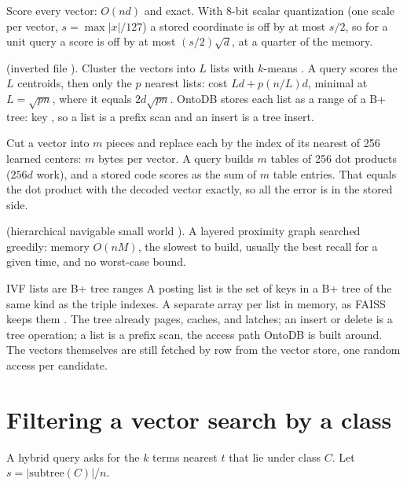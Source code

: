 \begin{description}[leftmargin=1.2em]
\item[Flat.] Score every vector: $O(nd)$ and exact. With 8-bit scalar
quantization (one scale per vector, $s = \max|x|/127$) a stored coordinate is
off by at most $s/2$, so for a unit query a score is off by at most
$(s/2)\sqrt d$, at a quarter of the memory.
\item[IVF] (inverted file \cite{jegou2011}). Cluster the vectors into $L$ lists
with $k$-means \cite{arthur2007}. A query scores the $L$ centroids, then only the
$p$ nearest lists: cost $Ld + p(n/L)d$, minimal at $L=\sqrt{pn}$, where it equals
$2d\sqrt{pn}$. OntoDB stores each list as a range of a B+ tree: key
, so a list is a prefix scan and an insert is a tree
insert.
\item[Product quantization.] Cut a vector into $m$ pieces and replace each by the
index of its nearest of 256 learned centers: $m$ bytes per vector. A query builds
$m$ tables of 256 dot products ($256d$ work), and a stored code scores as the sum
of $m$ table entries. That equals the dot product with the decoded vector exactly,
so all the error is in the stored side.
\item[HNSW] (hierarchical navigable small world \cite{malkov2020}). A layered
proximity graph searched greedily: memory $O(nM)$, the slowest to build, usually
the best recall for a given time, and no worst-case bound.
\end{description}

\begin{decision}{IVF lists are B+ tree ranges}
 A posting list is the set of keys  in a
B+ tree of the same kind as the triple indexes.
 A separate array per list in memory, as FAISS keeps them
\cite{johnson2021}.
 The tree already pages, caches, and latches; an insert or delete is a
tree operation; a list is a prefix scan, the access path OntoDB is built around.
 The vectors themselves are still fetched by row from the vector store,
one random access per candidate.
\end{decision}

\section{Filtering a vector search by a class}

A hybrid query asks for the $k$ terms nearest $t$ that lie under class $C$. Let
$s = |\mathrm{subtree}(C)|/n$.

